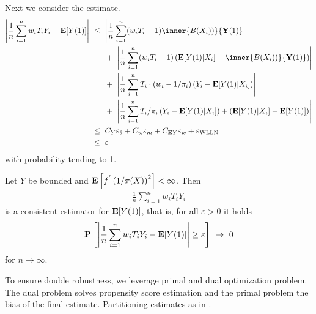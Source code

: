 Next we consider the estimate.
\begin{align*}
  \left| 
    \frac{1}{n}
    \sum_{i=1}^{n} 
    w_i
    T_i
    Y_i
    -
    \E[Y(1)]
  \right|
  &
  \ 
  \le
  \ 
  \left|  
  \frac{1}{n}
    \sum_{i=1}^{n} 
    (
    w_i T_i
    -
    1
    )
    \inner
    {B(X_i))}
    { \mathbf{Y}(1) }
  \right|
  \\
  &
  \qquad
  +
  \ 
  \left|  
  \frac{1}{n}
    \sum_{i=1}^{n} 
    (
    w_i T_i
    -
    1
    )
    \left( 
    \E[Y(1)| X_i]
    -
    \inner
    {B(X_i))}
    { \mathbf{Y}(1) }
    \right)
  \right|
  \\
  &
  \qquad
  +
  \ 
  \left|  
  \frac{1}{n}
    \sum_{i=1}^{n} 
    T_i
    \cdot
    (
    w_i 
    -
    1/\pi_i
    )
    \left( 
      Y_i
    -
    \E[Y(1)| X_i]
    \right)
  \right|
  \\
  &
  \qquad
  +
  \ 
  \left|  
  \frac{1}{n}
    \sum_{i=1}^{n} 
    T_i
    /\pi_i
    \left( 
      Y_i
    -
    \E[Y(1)| X_i]
    \right)
    +
    \left( 
    \E[Y(1)| X_i]
    -
    \E[Y(1)]
    \right)
  \right|
  \\
  &
  \ 
  \le
  \ 
  C_Y
  \varepsilon _ \delta
  +
  C_w
  \varepsilon _ m
  +
  C_{\E Y}
  \varepsilon _ w
  +
  \varepsilon _ {\mathrm{WLLN}}
  \\
  &
  \ 
  \le
  \ 
  \varepsilon
\end{align*}
with probability tending to 1.
\begin{ftheorem}
  Let 
  $Y$
  be bounded
  and 
  $
    \mathbf{E}
    \left[ 
      f ^ { ' }
\left( 
  1 / \pi(X)
\right)
^2
    \right]
    <
    \infty
  $.
  Then 
  \begin{gather}
    \frac{1}{n}
    \sum_{i=1}^{n} 
    w_i
    T_i
    Y_i
  \end{gather}
  is a consistent estimator for $\mathbf{E}[Y(1)]$,
  that is, for all 
  $
    \varepsilon > 0
  $
  it holds
  \begin{gather}
    \P
    \left[ 
      \left| 
    \frac{1}{n}
    \sum_{i=1}^{n} 
    w_i
    T_i
    Y_i
    -
    \E[Y(1)]
      \right|
    \ge 
    \varepsilon
    \right]
    \ 
    \to
    \ 
    0
  \end{gather}
  for 
  $n\to \infty$.
\end{ftheorem}

\begin{takeaways}
  To ensure double robustness, we leverage primal and dual optimization
  problem. The dual problem solves propensity score estimation and the 
  primal problem the bias of the final estimate.
  Partitioning estimates as in \cite{Gyorfi2002}. 
\end{takeaways}

